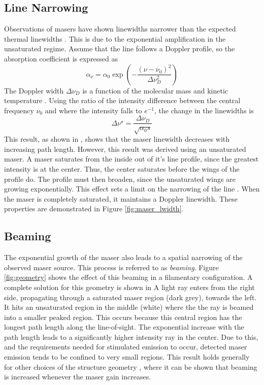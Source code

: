 \subsection{Line Narrowing}
\label{sub:line_narrow}

Observations of masers have shown linewidths narrower than the expected thermal linewidths \citep[e.g.,]{Elitzur_1992,stahler_palla_2004}. This is due to the exponential amplification in the unsaturated regime. Assume that the line follows a Doppler profile, so the absorption coefficient is expressed as
\begin{equation}
\label{eq:doppler_profile}
\alpha_\nu = \alpha_0 \exp\left( -\frac{(\nu - \nu_0)^2}{\Delta\nu_D^2} \right)
\end{equation}
The Doppler width $\Delta\nu_D$ is a function of the molecular mass and kinetic temperature \citep{stahler_palla_2004}. Using the ratio of the intensity difference between the central frequency $\nu_0$ and where the intensity falls to $e^{-1}$, the change in the linewidths is
\begin{equation}
\label{eq:line_narrow}
\Delta\nu^\star = \frac{\Delta\nu_D}{\sqrt{\alpha_0 s}}
\end{equation}
This result, as shown in \citet{stahler_palla_2004}, shows that the maser linewidth decreases with increasing path length. However, this result was derived using an unsaturated maser. A maser saturates from the inside out of it's line profile, since the greatest intensity is at the center. Thus, the center saturates before the wings of the profile do. The profile must then broaden, since the unsaturated wings are growing exponentially. This effect sets a limit on the narrowing of the line \citep{elitzur1992_text,stahler_palla_2004}. When the maser is completely saturated, it maintains a Doppler linewidth. These properties are demonstrated in Figure \ref{fig:maser_lwidth}. 

\subsection{Beaming}
\label{sub:beaming}

The exponential growth of the maser also leads to a spatial narrowing of the observed maser source. This process is referred to as {\it beaming}. Figure \ref{fig:geometry} shows the effect of this beaming in a filamentary configuration. A complete solution for this geometry is shown in \citet{Elitzur_1991} A light ray enters from the right side, propagating through a saturated maser region (dark grey), towards the left. It hits an unsaturated region in the middle (white) where the the ray is beamed into a smaller peaked region. This occurs because this central region has the longest path length along the line-of-sight. The exponential increase with the path length leads to a significantly higher intensity ray in the center. Due to this, and the requirements needed for stimulated emission to occur, detected maser emission tends to be confined to very small regions. This result holds generally for other choices of the structure geometry \citep{Elitzur_1990_paperII}, where it can be shown that beaming is increased whenever the maser gain increases.

